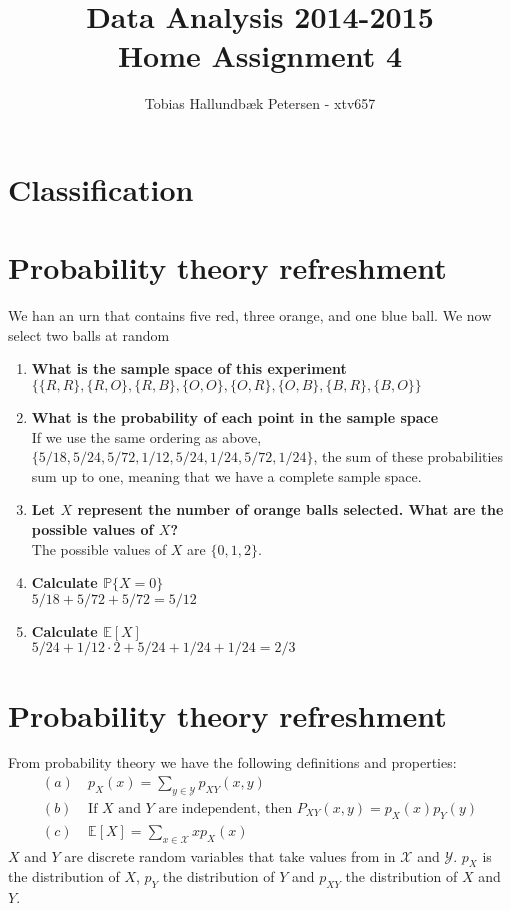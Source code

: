 \documentclass[a4paper]{article}
\title{Data Analysis 2014-2015\\ Home Assignment 4}
\author{Tobias Hallundbæk Petersen - xtv657}
\def\E{\mathbb{E}}
\def\P{\mathbb{P}}
\begin{document}
\maketitle
\newpage
\section{Classification}

\section{Probability theory refreshment}
We han an urn that contains five red, three orange, and one blue ball. We now select two balls at random
\begin{enumerate}
  \item \textbf{What is the sample space of this experiment}\\
    $\{\{R,R\},\{R,O\},\{R,B\},\{O,O\},\{O,R\},\{O,B\},\{B,R\},\{B,O\}\}$
  \item \textbf{What is the probability of each point in the sample space}\\
    If we use the same ordering as above, $\{5/18,5/24,5/72,1/12,5/24,1/24,5/72,1/24\}$, the sum of these probabilities sum up to one, meaning that we have a complete sample space.
  \item \textbf{Let $X$ represent the number of orange balls selected. What are the possible values of $X$?}\\
    The possible values of $X$ are $\{0,1,2\}.$
  \item \textbf{Calculate $\P\{X=0\}$}\\
    $5/18 + 5/72 + 5/72 = 5/12$
  \item \textbf{Calculate $\E[X]$}\\
    $5/24 + 1/12 \cdot 2 + 5/24 + 1/24 + 1/24 = 2/3$
\end{enumerate}
\section{Probability theory refreshment}
From probability theory we have the following definitions and properties:
\begin{align*}
(a) &\ p_X(x)=\sum_{y\in \mathcal{Y}}p_{XY}(x,y) \\
(b) &\ \mbox{If $X$ and $Y$ are independent, then $P_{XY}(x,y)=p_X(x)p_Y(y)$} \\
(c) &\ \mathbb{E}[X]=\sum_{x\in \mathcal{X}}xp_X(x)
\end{align*}
$X$ and $Y$ are discrete random variables that take values from in $\mathcal{X}$ and $\mathcal{Y}$. $p_X$ is the distribution of $X$, $p_Y$ the distribution of $Y$ and $p_{XY}$ the distribution of $X$ and $Y$.
\end{document}

